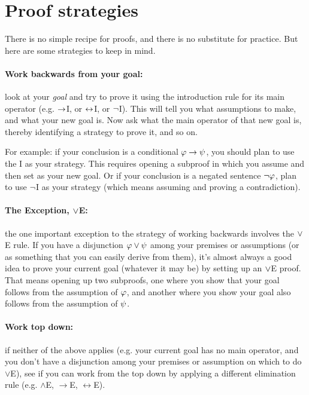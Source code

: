 \section{Proof strategies}\label{s:ProofStrategies}
There is no simple recipe for proofs, and there is no substitute for practice. But here are some strategies to keep in mind.

\paragraph{Work backwards from your goal:} look at your \emph{goal} and try to prove it using the introduction rule for its main operator (e.g. $\rightarrow$I, or $\leftrightarrow$I, or $\neg$I).  This will tell you what assumptions to make, and what your new goal is. Now ask what the main operator of that new goal is, thereby identifying a strategy to prove it, and so on.


For example: if your conclusion is a conditional $\mathcal{\varphi}\rightarrow\mathcal{\psi}$, you should plan to use the {\eif}I as your strategy. This requires opening a subproof in which you assume \meta{\varphi} and then set \meta{\psi} as your new goal.  Or if your conclusion is a negated sentence $\neg \mathcal{\varphi}$, plan to use $\neg$I as your strategy (which means assuming \meta{\varphi} and proving a contradiction).


\paragraph{The Exception, $\vee$E:} the one important exception to the strategy of working backwards involves the $\vee$E rule.  If you have a disjunction $\mathcal{\varphi} \vee \mathcal{\psi}$ among your premises or assumptions (or as something that you can easily derive from them), it's almost always a good idea to prove your current goal (whatever it may be) by setting up an $\vee$E proof.  That means opening up two  subproofs, one where you show that your goal follows from the assumption of $\mathcal{\varphi}$, and another where you show your goal also follows from the assumption of $\mathcal{\psi}$.


\paragraph{Work top down:} if neither of the above applies (e.g. your current goal has no main operator, and you don't have a disjunction among your premises or assumption on which to do $\lor$E), see if you can work from the top down by applying a different elimination rule (e.g. $\land$E, $\rightarrow$E, $\leftrightarrow$E).


